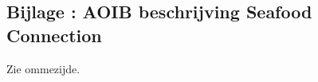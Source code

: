 \newpage
{}
\subsection*{\hypertarget{bij:aoib}{Bijlage \thebijlage}: AOIB beschrijving Seafood Connection}
Zie ommezijde.
\vfill
\begin{center}
\end{center}
